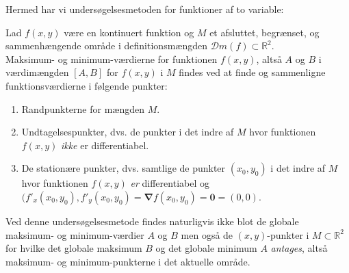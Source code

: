Hermed har vi undersøgelsesmetoden for funktioner af to variable:

\begin{method}[Undersøgelsesmetode]\label{metodeVm2Var}
Lad $f(x,y)$ være en kontinuert funktion og $M$ et afsluttet, begrænset, og sammenhængende område i definitionsmængden $\mathcal{D}m(f) \subset \mathbb{R}^{2}$.\\

Maksimum- og minimum-værdierne for funktionen $f(x,y)$, altså $A$ og $B$ i værdimængden $[A, B]$ for $f(x,y)$ i $M$  findes ved at finde og sammenligne funktionsværdierne i følgende punkter:
\begin{enumerate}
\item Randpunkterne for mængden $M$.
\item Undtagelsespunkter, dvs. de punkter i det indre af $M$ hvor funktionen $f(x,y)$ {\textit{ikke}} er differentiabel.
\item De stationære punkter, dvs. samtlige de punkter $(x_{0}, y_{0})$ i det indre af $M$ hvor funktionen $f(x,y)$ {\textit{er}} differentiabel og $(f'_{x}(x_{0}, y_{0}), f'_{y}(x_{0}, y_{0}) = \bm{\nabla}f(x_{0}, y_{0}) = \mathbf{0} = (0,0) $.
\end{enumerate}
\end{method}

\begin{think}
Ved denne undersøgelsesmetode findes naturligvis ikke blot de globale maksimum- og minimum-værdier $A$ og $B$ men også de $(x,y)$-punkter i $M \subset \mathbb{R}^{2}$ for hvilke
det globale maksimum $B$ og det globale minimum $A$ {\textit{antages}}, altså maksimum- og minimum-punkterne i det aktuelle område.
\end{think}






